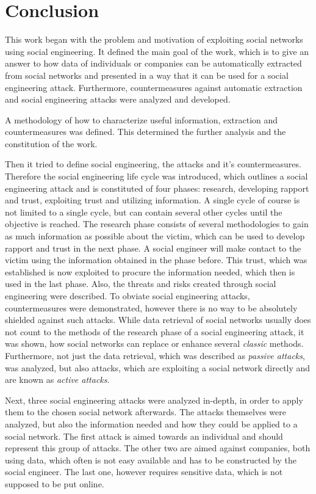 \chapter{Conclusion}
\label{chap:conclusion}

This work began with the problem and motivation of exploiting social networks
using social engineering. It defined the main goal of the work, which is to
give an answer to how data of individuals or companies can be automatically
extracted from social networks and presented in a way that it can be used for
a social engineering attack. Furthermore, countermeasures against automatic
extraction and social engineering attacks were analyzed and developed.

A methodology of how to characterize useful information, extraction and
countermeasures was defined. This determined the further analysis and the
constitution of the work.

Then it tried to define social engineering, the attacks and it's countermeasures.
Therefore the social engineering life cycle was introduced, which outlines a
social engineering attack and is constituted of four phases: research, developing
rapport and trust, exploiting trust and utilizing information. A single cycle
of course is not limited to a single cycle, but can contain several other
cycles until the objective is reached. The research phase consists of several
methodologies to gain as much information as possible about the victim, which
can be used to develop rapport and trust in the next phase. A social engineer
will make contact to the victim using the information obtained in the phase
before. This trust, which was established is now exploited to procure the
information needed, which then is used in the last phase. Also, the threats
and risks created through social engineering were described. To obviate social
engineering attacks, countermeasures were demonstrated, however there is no way
to be absolutely shielded against such attacks. While data retrieval of social
networks usually does not count to the methods of the research phase of a
social engineering attack, it was shown, how social networks can replace or
enhance several \textit{classic} methods. Furthermore, not just the data
retrieval, which was described as \textit{passive attacks}, was analyzed, but
also attacks, which are exploiting a social network directly and are known as
\textit{active attacks}.

Next, three social engineering attacks were analyzed in-depth, in order to
apply them to the chosen social network afterwards. The attacks themselves were
analyzed, but also the information needed and how they could be applied to a
social network. The first attack is aimed towards an individual and should
represent this group of attacks. The other two are aimed against companies,
both using data, which often is not easy available and has to be constructed by
the social engineer. The last one, however requires sensitive data, which is
not supposed to be put online.

